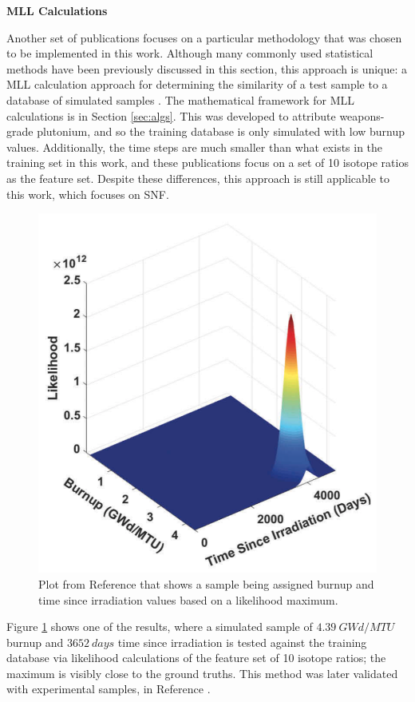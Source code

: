\noindent \textbf{MLL Calculations}

Another set of publications focuses on a particular methodology that was chosen
to be implemented in this work. Although many commonly used statistical methods
have been previously discussed in this section, this approach is unique: a
\gls{MLL} calculation approach for determining the similarity of a test sample
to a database of simulated samples \cite{mll_method}.  The mathematical
framework for \gls{MLL} calculations is in Section \ref{sec:algs}.  This was
developed to attribute weapons-grade plutonium, and so the training database is
only simulated with low burnup values.  Additionally, the time steps are much
smaller than what exists in the training set in this work, and these
publications focus on a set of 10 isotope ratios as the feature set.  Despite
these differences, this approach is still applicable to this work, which
focuses on \gls{SNF}. 

\begin{figure}[!htb]
  \centering
  \includegraphics[width=0.6\linewidth]{./chapters/litrev/tamu.png}
  \caption[Example of likelihood maximum predicting burnup and time since 
           irradiation]
          {Plot from Reference \cite{mll_method} that shows a sample being 
           assigned burnup and time since irradiation values based on a 
           likelihood maximum.}
  \label{fig:tamu}
\end{figure}

Figure \ref{fig:tamu} shows one of the results, where a simulated sample of
$4.39\:GWd/MTU$ burnup and $3652\:days$ time since irradiation is tested
against the training database via likelihood calculations of the feature set of
10 isotope ratios; the maximum is visibly close to the ground truths.  This
method was later validated with experimental samples, in Reference
\cite{mll_validate}. 


